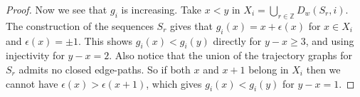 \documentclass[12pt]{article}
\newcommand{\F}{\mathbb{F}}
\newcommand{\R}{\mathbb{R}}
\newcommand{\Z}{\mathbb Z}
\theoremstyle{definition}
\begin{document}
\begin{proof}
Now we see that $g_i$ is increasing. Take $x<y$ in $X_i = \bigcup_{r\in\Z}D_w(S_r,i)$. The construction of the sequences $S_r$ gives that $g_i(x)=x+\epsilon(x)$ for $x\in X_i$ and $\epsilon(x)=\pm 1$. This shows $g_i(x)<g_i(y)$ directly for $y-x\geq 3$, and using injectivity for $y-x=2$. Also notice that the union of the trajectory graphs for $S_r$ admits no closed edge-paths. So if both $x$ and $x+1$ belong in $X_i$ then we cannot have $\epsilon(x)>\epsilon(x+1)$, which gives $g_i(x)<g_i(y)$ for $y-x=1$.







\end{proof}









\end{document}

